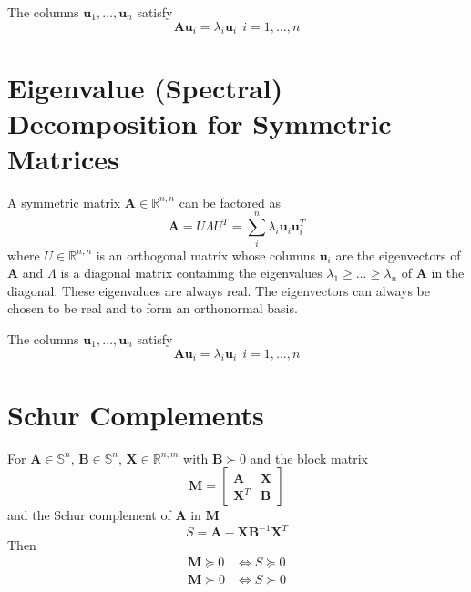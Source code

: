 \documentclass{book}
\newcommand{\mA}{\mathbf{A}}
\newcommand{\mB}{\mathbf{B}}
\newcommand{\mM}{\mathbf{M}}
\newcommand{\mX}{\mathbf{X}}
\newcommand{\vu}{\mathbf{u}}
\newcommand{\sRnm}{\mathbb{R}^{n,m}}
\newcommand{\sSn}{\mathbb{S}^{n}}
\newcommand{\ispsd}{\succeq}
\newcommand{\ispd}{\succ}
\begin{document}
The columns $\vu_1,\ldots,\vu_n$ satisfy
\begin{equation}
\mA \vu_i=\lambda_i \vu_i~~i=1,\ldots,n
\end{equation}

\section{Eigenvalue (Spectral) Decomposition for Symmetric Matrices}

A symmetric matrix $\mA\in\mathbb{R}^{n,n}$ can be factored as
\begin{equation}
\mA=U\Lambda U^T=\sum_i^n \lambda_i \vu_i \vu_i^T
\end{equation}
where $U\in\mathbb{R}^{n,n}$ is an orthogonal matrix whose columns $\vu_i$ are the eigenvectors of $\mA$ and $\Lambda$ is a diagonal matrix containing the eigenvalues $\lambda_1\ge\ldots\ge\lambda_n$ of $\mA$ in the diagonal. These eigenvalues are always real. The eigenvectors can always be chosen to be real and to form an orthonormal basis.

The columns $\vu_1,\ldots,\vu_n$ satisfy
\begin{equation}
\mA \vu_i=\lambda_i \vu_i~~i=1,\ldots,n
\end{equation}


\section{Schur Complements}

For $\mA\in\sSn$, $\mB\in\sSn$, $\mX\in\sRnm$ with $\mB\ispd0$ and the block matrix
\begin{equation}
\mM=
\begin{bmatrix}
\mA & \mX \\
\mX^T & \mB
\end{bmatrix}
\end{equation}
and the Schur complement of $\mA$ in $\mM$
\begin{equation}
S=\mA-\mX\mB^{-1}\mX^T
\end{equation}
Then
\begin{align}
\mM\ispsd0&\iff S\ispsd0 \\
\mM\ispd0 &\iff S\ispd0 
\end{align}
\end{document}
